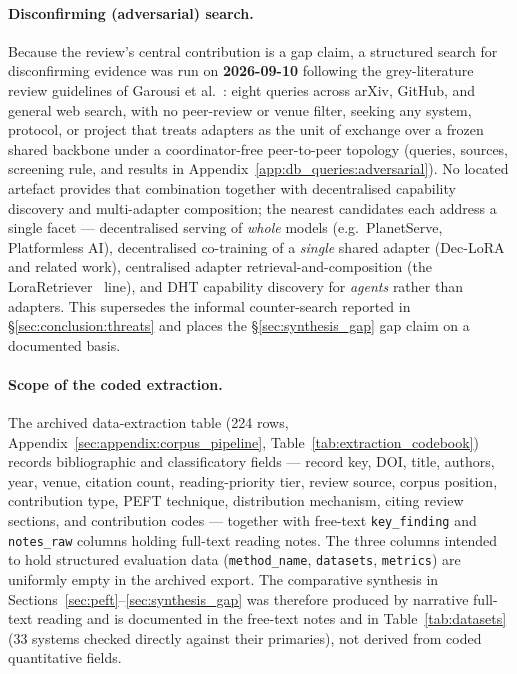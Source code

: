 \paragraph{Disconfirming (adversarial) search.}
Because the review's central contribution is a gap claim, a structured search
for disconfirming evidence was run on \textbf{2026-09-10} following the
grey-literature review guidelines of Garousi et al.~\cite{Garousi2019}: eight
queries across arXiv, GitHub, and general web search, with no peer-review or
venue filter, seeking any system, protocol, or project that treats adapters as
the unit of exchange over a frozen shared backbone under a coordinator-free
peer-to-peer topology (queries, sources, screening rule, and results in
Appendix~\ref{app:db_queries:adversarial}). No located artefact provides that
combination together with decentralised capability discovery and multi-adapter
composition; the nearest candidates each address a single facet ---
decentralised serving of \emph{whole} models (e.g.\ PlanetServe, Platformless
AI), decentralised co-training of a \emph{single} shared adapter
(Dec-LoRA~\cite{Ghiasvand2025} and related work), centralised adapter
retrieval-and-composition (the LoraRetriever~\cite{ZhaoLoraRetriever2024}
line), and DHT capability discovery for \emph{agents} rather than adapters. This
supersedes the informal counter-search reported in
\S\ref{sec:conclusion:threats} and places the \S\ref{sec:synthesis_gap} gap
claim on a documented basis.

\paragraph{Scope of the coded extraction.}
The archived data-extraction table (224 rows,
Appendix~\ref{sec:appendix:corpus_pipeline}, Table~\ref{tab:extraction_codebook})
records bibliographic and classificatory fields --- record key, DOI, title,
authors, year, venue, citation count, reading-priority tier, review source,
corpus position, contribution type, PEFT technique, distribution mechanism,
citing review sections, and contribution codes --- together with free-text
\texttt{key\_finding} and \texttt{notes\_raw} columns holding full-text reading
notes. The three columns intended to hold structured evaluation data
(\texttt{method\_name}, \texttt{datasets}, \texttt{metrics}) are uniformly empty
in the archived export. The comparative synthesis in
Sections~\ref{sec:peft}--\ref{sec:synthesis_gap} was therefore produced by
narrative full-text reading and is documented in the free-text notes and in
Table~\ref{tab:datasets} (33 systems checked directly against their primaries),
not derived from coded quantitative fields.


